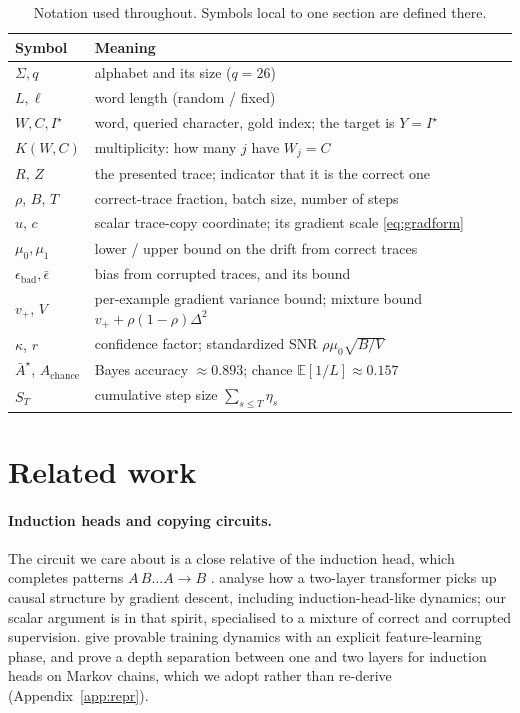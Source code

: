 \documentclass{article}
\theoremstyle{plain}
\theoremstyle{definition}
\theoremstyle{remark}
\newcommand{\E}{\mathbb{E}}
\newcommand{\1}{\mathbf{1}}
\newcommand{\bad}{\mathrm{bad}}
\begin{document}
\begin{table}[t]
\caption{Notation used throughout. Symbols local to one section are defined
there.}
\label{tab:notation}
\centering
\small
\begin{tabular}{ll}
\toprule
Symbol & Meaning \\
\midrule
$\Sigma, q$ & alphabet and its size ($q = 26$) \\
$L, \ell$ & word length (random / fixed) \\
$W, C, I^\star$ & word, queried character, gold index; the target is $Y = I^\star$ \\
$K(W,C)$ & multiplicity: how many $j$ have $W_j = C$ \\
$R$, $Z$ & the presented trace; indicator that it is the correct one \\
$\rho$, $B$, $T$ & correct-trace fraction, batch size, number of steps \\
$u$, $c$ & scalar trace-copy coordinate; its gradient scale \eqref{eq:gradform} \\
$\mu_0,\mu_1$ & lower / upper bound on the drift from correct traces \\
$\epsilon_\bad,\bar\epsilon$ & bias from corrupted traces, and its bound \\
$v_+$, $V$ & per-example gradient variance bound; mixture bound $v_+ +\rho(1-\rho)\Delta^2$ \\
$\kappa$, $r$ & confidence factor; standardized SNR $\rho\mu_0\sqrt{B/V}$ \\
$\bar A^\star$, $A_{\mathrm{chance}}$ & Bayes accuracy $\approx0.893$; chance $\E[1/L]\approx0.157$ \\
$S_T$ & cumulative step size $\sum_{s\le T}\eta_s$ \\
\bottomrule
\end{tabular}
\end{table}

\section{Related work}
\label{sec:related}

\paragraph{Induction heads and copying circuits.}
The circuit we care about is a close relative of the induction head, which
completes patterns $A\,B\ldots A\to B$ \citep{olsson2022incontext}.
\citet{nichani2024how} analyse how a two-layer transformer picks up causal
structure by gradient descent, including induction-head-like dynamics; our scalar
argument is in that spirit, specialised to a mixture of correct and corrupted
supervision. \citet{chen2024unveiling} give provable training dynamics with an
explicit feature-learning phase, and \citet{ekbote2025what} prove a depth
separation between one and two layers for induction heads on Markov chains, which
we adopt rather than re-derive (Appendix~\ref{app:repr}).
\end{document}
